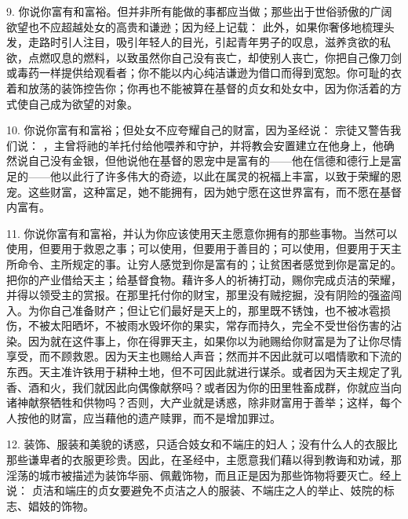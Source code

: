 9. 你说你富有和富裕。但并非所有能做的事都应当做；那些出于世俗骄傲的广阔欲望也不应超越处女的高贵和谦逊；因为经上记载： 此外，如果你奢侈地梳理头发，走路时引人注目，吸引年轻人的目光，引起青年男子的叹息，滋养贪欲的私欲，点燃叹息的燃料，以致虽然你自己没有丧亡，却使别人丧亡，你把自己像刀剑或毒药一样提供给观看者；你不能以内心纯洁谦逊为借口而得到宽恕。你可耻的衣着和放荡的装饰控告你；你再也不能被算在基督的贞女和处女中，因为你活着的方式使自己成为欲望的对象。\par

10. 你说你富有和富裕；但处女不应夸耀自己的财富，因为圣经说： 宗徒又警告我们说： ，主曾将祂的羊托付给他喂养和守护，并将教会安置建立在他身上，他确然说自己没有金银，但他说他在基督的恩宠中是富有的——他在信德和德行上是富足的——他以此行了许多伟大的奇迹，以此在属灵的祝福上丰富，以致于荣耀的恩宠。这些财富，这种富足，她不能拥有，因为她宁愿在这世界富有，而不愿在基督内富有。\par

11. 你说你富有和富裕，并认为你应该使用天主愿意你拥有的那些事物。当然可以使用，但要用于救恩之事；可以使用，但要用于善目的；可以使用，但要用于天主所命令、主所规定的事。让穷人感觉到你是富有的；让贫困者感觉到你是富足的。把你的产业借给天主；给基督食物。藉许多人的祈祷打动，赐你完成贞洁的荣耀，并得以领受主的赏报。在那里托付你的财宝，那里没有贼挖掘，没有阴险的强盗闯入。为你自己准备财产；但让它们最好是天上的，那里既不锈蚀，也不被冰雹损伤，不被太阳晒坏，不被雨水毁坏你的果实，常存而持久，完全不受世俗伤害的沾染。因为就在这件事上，你在得罪天主，如果你以为祂赐给你财富是为了让你尽情享受，而不顾救恩。因为天主也赐给人声音；然而并不因此就可以唱情歌和下流的东西。天主准许铁用于耕种土地，但不可因此就进行谋杀。或者因为天主规定了乳香、酒和火，我们就因此向偶像献祭吗？或者因为你的田里牲畜成群，你就应当向诸神献祭牺牲和供物吗？否则，大产业就是诱惑，除非财富用于善举；这样，每个人按他的财富，应当藉他的遗产赎罪，而不是增加罪过。\par

12. 装饰、服装和美貌的诱惑，只适合妓女和不端庄的妇人；没有什么人的衣服比那些谦卑者的衣服更珍贵。因此，在圣经中，主愿意我们藉以得到教诲和劝诫，那淫荡的城市被描述为装饰华丽、佩戴饰物，而且正是因为那些饰物将要灭亡。经上说：  贞洁和端庄的贞女要避免不贞洁之人的服装、不端庄之人的举止、妓院的标志、娼妓的饰物。\par

